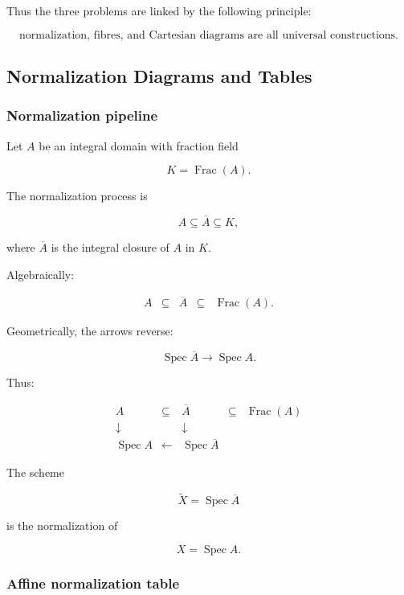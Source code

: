 \documentclass[12pt,a4paper]{article}
\theoremstyle{notespace}
\begin{document}
Thus the three problems are linked by the following principle:

\[
\boxed{
	\text{normalization, fibres, and Cartesian diagrams are all universal constructions.}
}
\]

\subsection{Normalization Diagrams and Tables}

\subsubsection{Normalization pipeline}

Let \(A\) be an integral domain with fraction field

\[
K=\operatorname{Frac}(A).
\]

The normalization process is

\[
A\subseteq \overline{A}\subseteq K,
\]

where \(\overline{A}\) is the integral closure of \(A\) in \(K\).

Algebraically:

\[
\begin{array}{ccccc}
	A & \subseteq & \overline{A} & \subseteq & \operatorname{Frac}(A).
\end{array}
\]

Geometrically, the arrows reverse:

\[
\operatorname{Spec}\overline{A}
\longrightarrow
\operatorname{Spec}A.
\]

Thus:

\[
\begin{array}{ccccc}
	A & \subseteq & \overline{A} & \subseteq & \operatorname{Frac}(A) \\
	\downarrow & & \downarrow & & \\
	\operatorname{Spec}A & \longleftarrow & \operatorname{Spec}\overline{A} & &
\end{array}
\]

The scheme

\[
\widetilde{X}=\operatorname{Spec}\overline{A}
\]

is the normalization of

\[
X=\operatorname{Spec}A.
\]

\subsubsection{Affine normalization table}
\end{document}
